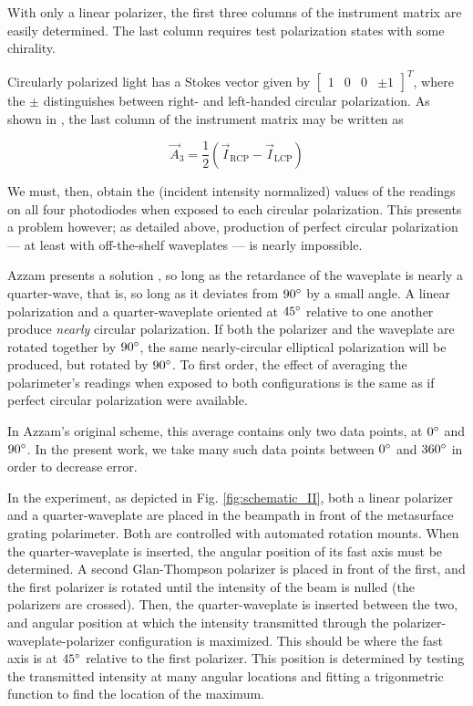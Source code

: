 \documentclass[footinbib,aps,prl,superscriptaddress]{revtex4-1}
\begin{document}
With only a linear polarizer, the first three columns of the instrument matrix are easily determined. The last column requires test polarization states with some chirality.

Circularly polarized light has a Stokes vector given by $\begin{bmatrix}
1 & 0 & 0 & \pm 1
\end{bmatrix}^T$, where the $\pm$ distinguishes between right- and left-handed circular polarization. As shown in \citep{Azzam1989}, the last column of the instrument matrix may be written as

\begin{equation}
\label{eqn:A3}
\vec{A}_3 = \frac{1}{2} (\vec{I}_{\text{RCP}} - \vec{I}_{\text{LCP}})
\end{equation}

We must, then, obtain the (incident intensity normalized) values of the readings on all four photodiodes when exposed to each circular polarization. This presents a problem however; as detailed above, production of perfect circular polarization --- at least with off-the-shelf waveplates --- 
is nearly impossible.

Azzam presents a solution \citep{Azzam1989}, so long as the retardance of the waveplate is nearly a quarter-wave, that is, so long as it deviates from $90\degree$ by a small angle. A linear polarization and a quarter-waveplate oriented at $45\degree$ relative to one another produce \textit{nearly} circular polarization. If both the polarizer and the waveplate are rotated together by $90\degree$, the same nearly-circular elliptical polarization will be produced, but rotated by $90\degree$. To first order, the effect of averaging the polarimeter's readings when exposed to both configurations is the same as if perfect circular polarization were available.

In Azzam's original scheme, this average contains only two data points, at $0\degree$ and $90\degree$. In the present work, we take many such data points between $0\degree$ and $360\degree$ in order to decrease error.

In the experiment, as depicted in Fig. \ref{fig:schematic_II}, both a linear polarizer and a quarter-waveplate are placed in the beampath in front of the metasurface grating polarimeter. Both are controlled with automated rotation mounts. When the quarter-waveplate is inserted, the angular position of its fast axis must be determined. A second Glan-Thompson polarizer is placed in front of the first, and the first polarizer is rotated until the intensity of the beam is nulled (the polarizers are crossed). Then, the quarter-waveplate is inserted between the two, and angular position at which the intensity transmitted through the polarizer-waveplate-polarizer configuration is maximized. This should be where the fast axis is at $45\degree$ relative to the first polarizer. This position is determined by testing the transmitted intensity at many angular locations and fitting a trigonmetric function to find the location of the maximum.
\end{document}
